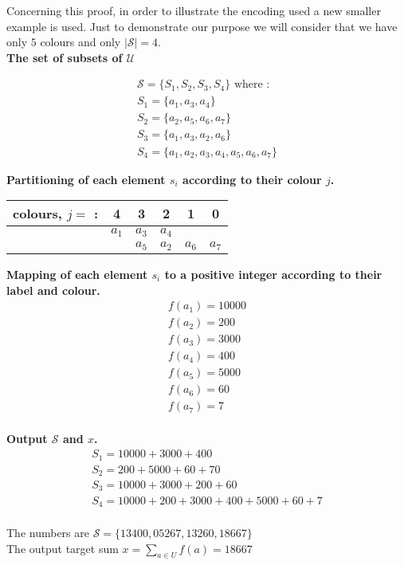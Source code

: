 \begin{example} \label{example:reduction}
Concerning this proof, in order to illustrate the encoding used a new smaller example is used. Just to demonstrate our purpose we will
consider that we have only $5$ colours and only $|\mathcal{S}| = 4$.  \\

\textbf{The set of subsets of $\mathcal{U}$} \hfill

\begin{gather*}
    \mathcal{S} = \{S_1, S_2, S_3, S_4\} \text{ where :} \\
    S_1 = \{a_1, a_3, a_4\}  \\
    S_2 = \{a_2, a_5,a_6, a_7\}  \\
    S_3 = \{a_1, a_3, a_2, a_6\}  \\
    S_4 = \{a_1, a_2, a_3, a_4, a_5, a_6, a_7\}
\end{gather*}

\textbf{Partitioning of each element $s_i$ according to their colour $j$.} \hfill
\begin{center}
  \begin{tabular}{ |c|c|c|c||c|c| }
    \hline
    colours, $j =$ : & 4 & 3 & 2 & 1 & 0 \\
    \hline
    & $a_1$ & $a_3$ & $a_4$ & &          \\
    &  & $a_5$ & $a_2$ & $a_6$ & $a_7$  \\
    \hline
  \end{tabular}
\end{center}

\textbf{Mapping of each element $s_i$ to a positive integer according to their label and colour.} \hfill
\begin{gather*}
  f(a_1) = 10000 \\
  f(a_2) = 200   \\
  f(a_3) = 3000  \\
  f(a_4) = 400   \\
  f(a_5) = 5000  \\
  f(a_6) = 60    \\
  f(a_7) = 7     \\
\end{gather*}

\textbf{Output $\mathcal{S}$ and $x$.} \hfill
\begin{gather*}
  S_1 = 10000 + 3000 + 400 \\
  S_2 = 200 + 5000 + 60 + 70   \\
  S_3 = 10000 + 3000 + 200 + 60  \\
  S_4 = 10000 + 200 + 3000 + 400 + 5000 + 60 + 7   \\
\end{gather*}
\begin{center}
  The numbers are  $\mathcal {S} = \{13400, 05267, 13260, 18667\} $ \\
  The output target sum $x = \sum_{a \in U} f(a) = 18667$
\end{center}


\end{example}
